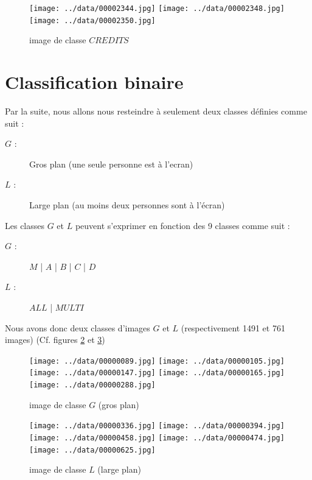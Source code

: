 \documentclass{book}
\begin{document}
\begin{figure}[H]
\begin{center}
\texttt{[image: ../data/00002344.jpg]}
\texttt{[image: ../data/00002348.jpg]}
\texttt{[image: ../data/00002350.jpg]}
\end{center}
\caption{image de classe $CREDITS$}
\label{classeCREDITS}
\end{figure}

\section{Classification binaire}

Par la suite, nous allons nous resteindre à seulement deux classes définies comme suit :\\
\begin{description} %
\item[$G$ :] \og Gros plan \fg{} (une seule personne est à l'ecran)
\item[$L$ :] \og Large plan \fg{} (au moins deux personnes sont à l'écran)\\
\end{description}


Les classes $G$ et $L$ peuvent s'exprimer en fonction des 9 classes comme suit :\\

\begin{description} %
\item[$G$ :] $M$ | $A$ | $B$ | $C$ | $D$
\item[$L$ :] $ALL$ | $MULTI$\\
\end{description}


Nous avons donc deux classes d'images $G$ et $L$ (respectivement 1491 et 761 images) (Cf. figures \ref{classeG} et
\ref{classeL}) \\

\begin{figure}[H]
\begin{center}
\texttt{[image: ../data/00000089.jpg]}
\texttt{[image: ../data/00000105.jpg]}
\texttt{[image: ../data/00000147.jpg]}
\texttt{[image: ../data/00000165.jpg]}
\texttt{[image: ../data/00000288.jpg]}
\end{center}
\caption{image de classe $G$ (gros plan)}
\label{classeG}
\end{figure}

\begin{figure}[H]
\begin{center}
\texttt{[image: ../data/00000336.jpg]}
\texttt{[image: ../data/00000394.jpg]}
\texttt{[image: ../data/00000458.jpg]}
\texttt{[image: ../data/00000474.jpg]}
\texttt{[image: ../data/00000625.jpg]}
\end{center}
\caption{image de classe $L$ (large plan)}
\label{classeL}
\end{figure}
\end{document}
